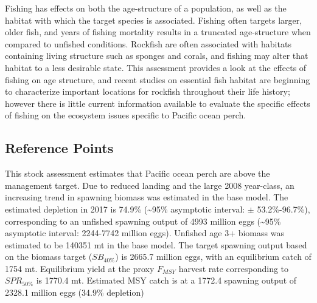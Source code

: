 \documentclass[12pt,]{article}
\begin{document}
Fishing has effects on both the age-structure of a population, as well
as the habitat with which the target species is associated. Fishing
often targets larger, older fish, and years of fishing mortality results
in a truncated age-structure when compared to unfished conditions.
Rockfish are often associated with habitats containing living structure
such as sponges and corals, and fishing may alter that habitat to a less
desirable state. This assessment provides a look at the effects of
fishing on age structure, and recent studies on essential fish habitat
are beginning to characterize important locations for rockfish
throughout their life history; however there is little current
information available to evaluate the specific effects of fishing on the
ecosystem issues specific to Pacific ocean perch.

\subsection*{Reference Points}\label{reference-points}

This stock assessment estimates that Pacific ocean perch are above the
management target. Due to reduced landing and the large 2008 year-class,
an increasing trend in spawning biomass was estimated in the base model.
The estimated depletion in 2017 is 74.9\% (\textasciitilde{}95\%
asymptotic interval: \(\pm\) 53.2\%-96.7\%), corresponding to an
unfished spawning output of 4993 million eggs (\textasciitilde{}95\%
asymptotic interval: 2244-7742 million eggs). Unfished age 3+ biomass
was estimated to be 140351 mt in the base model. The target spawning
output based on the biomass target (\(SB_{40\%}\)) is 2665.7 million
eggs, with an equilibrium catch of 1754 mt. Equilibrium yield at the
proxy \(F_{MSY}\) harvest rate corresponding to \(SPR_{50\%}\) is 1770.4
mt. Estimated MSY catch is at a 1772.4 spawning output of 2328.1 million
eggs (34.9\% depletion)
\end{document}
